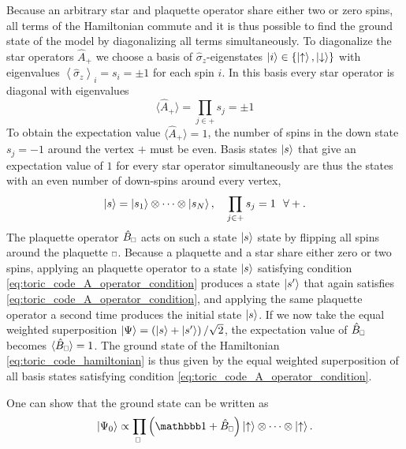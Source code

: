 Because an arbitrary star and plaquette operator share either two or zero spins, all terms of the Hamiltonian commute and it is thus possible to find the ground state of the model by diagonalizing all terms simultaneously. To diagonalize the star operators $\hat{A}_+$ we choose a basis of $\hat{\sigma}_z$-eigenstates $\ket{i} \in \left\{\ket{\uparrow}, \ket{\downarrow}\right\}$ with eigenvalues $\left\langle\hat{\sigma}_z\right\rangle_i = s_i = \pm 1$ for each spin $i$. In this basis every star operator is diagonal with eigenvalues
\begin{equation}
	\label{eq:toric_code_star_operator_expectation value}
	\langle \hat{A}_+\rangle = \prod_{j\in+}s_j = \pm 1
\end{equation}
To obtain the expectation value $\langle \hat{A}_+\rangle = 1$, the number of spins in the down state $s_j = -1$ around the vertex $+$ must be even. Basis states $\ket{s}$ that give an expectation value of $1$ for every star operator simultaneously are thus the states with an even number of down-spins around every vertex,
\begin{equation}
	\label{eq:toric_code_A_operator_condition}
	\ket{s} = \ket{s_1} \otimes \dots \otimes \ket{s_N}, \quad \prod_{j\in+}s_j = 1 \,\,\,\,\forall +.
\end{equation}
The plaquette operator $\hat{B}_{\scalebox{0.6}{$\square$}}$ acts on such a state $\ket{s}$ state by flipping all spins around the plaquette $\scalebox{0.6}{$\square$}$. Because a plaquette and a star share either zero or two spins, applying an plaquette operator to a state $\ket{s}$ satisfying condition \eqref{eq:toric_code_A_operator_condition} produces a state $\ket{s^\prime}$ that again satisfies \eqref{eq:toric_code_A_operator_condition}, and applying the same plaquette operator a second time produces the initial state $\ket{s}$. If we now take the equal weighted superposition $\ket{\Psi} = \left(\ket{s}+\ket{s^\prime}\right)/\sqrt{2}$, the expectation value of $\hat{B}_{\scalebox{0.6}{$\square$}}$ becomes $\langle \hat{B}_{\scalebox{0.6}{$\square$}}\rangle = 1$.
The ground state of the Hamiltonian \eqref{eq:toric_code_hamiltonian} is thus given by the equal weighted superposition of all basis states satisfying condition \eqref{eq:toric_code_A_operator_condition}. \par
One can show that the ground state can be written as
\begin{equation}
	\ket{\Psi_0} \propto \prod_{\scalebox{0.6}{$\square$}}\left(\id + \hat{B}_{\scalebox{0.6}{$\square$}}\right) \ket{\uparrow} \otimes \dots \otimes \ket{\uparrow}.
\end{equation}
